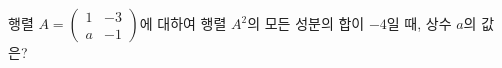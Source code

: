 행렬 $A=\begin{pmatrix} 1 & -3 \\ a & -1 \end{pmatrix}$에 대하여 행렬 $A^2$의 모든 성분의 합이 $-4$일 때, 상수 $a$의 값은?
